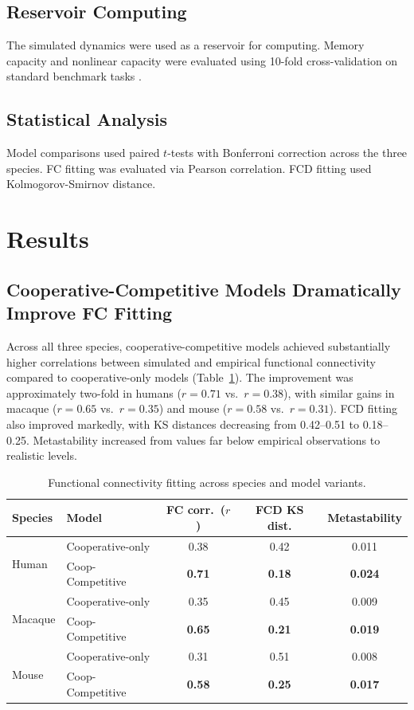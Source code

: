 \documentclass[11pt]{article}
\begin{document}
\subsection{Reservoir Computing}
The simulated dynamics were used as a reservoir for computing. Memory capacity and nonlinear capacity were evaluated using 10-fold cross-validation on standard benchmark tasks \citep{jaeger2004harnessing}.

\subsection{Statistical Analysis}
Model comparisons used paired $t$-tests with Bonferroni correction across the three species. FC fitting was evaluated via Pearson correlation. FCD fitting used Kolmogorov-Smirnov distance.

\section{Results}

\subsection{Cooperative-Competitive Models Dramatically Improve FC Fitting}

Across all three species, cooperative-competitive models achieved substantially higher correlations between simulated and empirical functional connectivity compared to cooperative-only models (Table~\ref{tab:fc}). The improvement was approximately two-fold in humans ($r = 0.71$ vs.\ $r = 0.38$), with similar gains in macaque ($r = 0.65$ vs.\ $r = 0.35$) and mouse ($r = 0.58$ vs.\ $r = 0.31$). FCD fitting also improved markedly, with KS distances decreasing from 0.42--0.51 to 0.18--0.25. Metastability increased from values far below empirical observations to realistic levels.

\begin{table}[h]
\centering
\caption{Functional connectivity fitting across species and model variants.}
\label{tab:fc}
\begin{tabular}{llccc}
\toprule
Species & Model & FC corr.\ ($r$) & FCD KS dist. & Metastability \\
\midrule
\multirow{2}{*}{Human} & Cooperative-only & 0.38 & 0.42 & 0.011 \\
 & Coop-Competitive & \textbf{0.71} & \textbf{0.18} & \textbf{0.024} \\
\midrule
\multirow{2}{*}{Macaque} & Cooperative-only & 0.35 & 0.45 & 0.009 \\
 & Coop-Competitive & \textbf{0.65} & \textbf{0.21} & \textbf{0.019} \\
\midrule
\multirow{2}{*}{Mouse} & Cooperative-only & 0.31 & 0.51 & 0.008 \\
 & Coop-Competitive & \textbf{0.58} & \textbf{0.25} & \textbf{0.017} \\
\bottomrule
\end{tabular}
\end{table}
\end{document}
